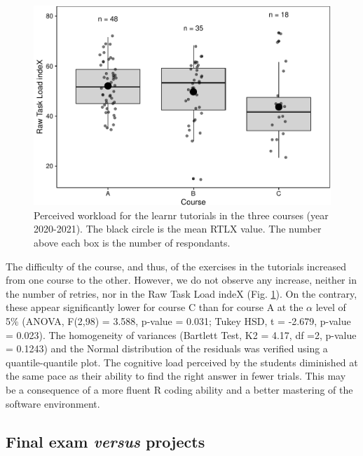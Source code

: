 \documentclass{aims}
\theoremstyle{definition}
\begin{document}
\begin{figure}
\includegraphics[width=1\linewidth]{teaching_data_science_files/figure-latex/fig_rtlx-1} \caption{\label{fig:fig_rtlx} Perceived workload for the learnr tutorials in the three courses (year 2020-2021). The black circle is the mean RTLX value. The number above each box is the number of respondants.}\label{fig:fig_rtlx}
\end{figure}

The difficulty of the course, and thus, of the exercises in the
tutorials increased from one course to the other. However, we do not
observe any increase, neither in the number of retries, nor in the Raw
Task Load indeX (Fig. \ref {fig:fig_rtlx}). On the contrary, these
appear significantly lower for course C than for course A at the
\(\alpha\) level of 5\% (ANOVA, F(2,98) = 3.588, p-value = 0.031; Tukey
HSD, t = -2.679, p-value = 0.023). The homogeneity of variances
(Bartlett Test, K2 = 4.17, df =2, p-value = 0.1243) and the Normal
distribution of the residuals was verified using a quantile-quantile
plot. The cognitive load perceived by the students diminished at the
same pace as their ability to find the right answer in fewer trials.
This may be a consequence of a more fluent R coding ability and a better
mastering of the software environment.

\hypertarget{final-exam-versus-projects-1}{%
\subsection{\texorpdfstring{Final exam \emph{versus}
projects}{Final exam versus projects}}\label{final-exam-versus-projects-1}}
\end{document}
